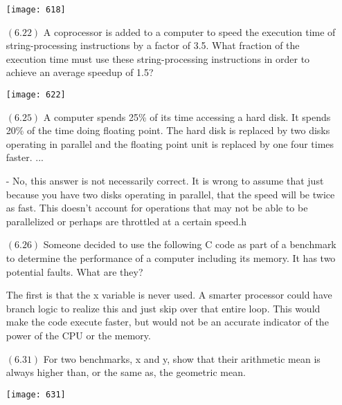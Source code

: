 \documentclass[letterpaper,10pt,titlepage]{article}
\begin{document}
\begin{enumerate}
\begin{center}
\texttt{[image: 618]}
\end{center}


\item[$(6.22)$] A coprocessor is added to a computer to speed the execution time of string-processing instructions by a factor of 3.5. What fraction of the execution time must use these string-processing instructions in order to achieve an average speedup of 1.5?

\begin{center}
\texttt{[image: 622]}
\end{center}


\item[$(6.25)$] A computer spends 25\% of its time accessing a hard disk. It spends 20\% of the time doing floating point. The hard disk is replaced by two disks operating in parallel and the floating point unit is replaced by one four times faster. ...

- No, this answer is not necessarily correct. It is wrong to assume that just because you have two disks operating in parallel, that the speed will be twice as fast. This doesn’t account for operations that may not be able to be parallelized or perhaps are throttled at a certain speed.h


\item[$(6.26)$] Someone decided to use the following C code as part of a benchmark to determine the performance of a computer including its memory. It has two potential faults. What are they?

The first is that the x variable is never used. A smarter processor could have branch logic to realize this and just skip over that entire loop. This would make the code execute faster, but would not be an accurate indicator of the power of the CPU or the memory. 


\item[$(6.31)$] For two benchmarks, x and y, show that their arithmetic mean is always higher than, or the same as, the geometric mean.

\begin{center}
\texttt{[image: 631]}
\end{center}

\end{enumerate}
\end{document}
